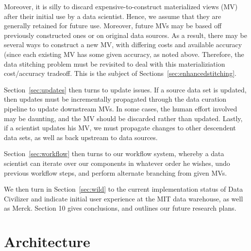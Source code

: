 Moreover, it is silly to discard expensive-to-construct materialized views (MV)
after their initial use by a data scientist.  Hence, we assume that they are
generally retained for future use.  Moreover, future MVs may be based off
previously constructed ones or on original data sources.  As a result, there may
be several ways to construct a new MV, with differing costs and available
accuracy (since each existing MV has some given accuracy, as noted above.
Therefore, the data stitching problem must be revisited to deal with this
materializiation cost/accuracy tradeoff.  This is the subject of Sections~\ref{sec:enhancedstitching}.

Section~\ref{sec:updates} then turns to update issues.   If a source data set is updated, then
updates must be incrementally propagated through the data curation pipeline to
update downstream MVs.  In some cases, the human effort involved may be
daunting, and the MV should be discarded rather than updated.  Lastly, if a
scientist updates his MV, we must propagate changes to other descendent data
sets, as well as back upstream to data sources. 

Section~\ref{sec:workflow} then turns to our workflow system, whereby a data scientist can
iterate over our components in whatever order he wishes, undo previous workflow
steps, and perform alternate branching from given MVs. 

We then turn in Section~\ref{sec:wild} to the current implementation status of Data Civilizer
and indicate initial user experience at the MIT data warehouse, as well as
Merck.  Section 10 gives conclusions, and outlines our future research plans.


\section{Architecture}


